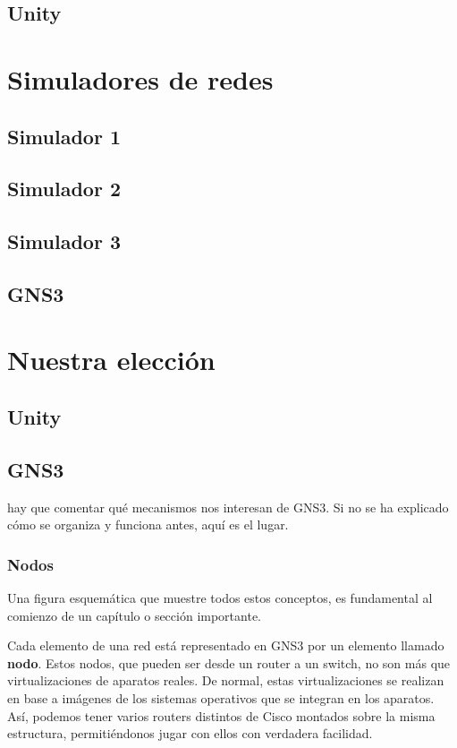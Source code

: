 \subsection{Unity}


\section{Simuladores de redes}

\subsection{Simulador 1}

\subsection{Simulador 2}

\subsection{Simulador 3}

\subsection{GNS3}

\section{Nuestra elección}

\subsection{Unity}

\subsection{GNS3}
hay que comentar qué mecanismos nos interesan de GNS3. Si no se ha explicado cómo se organiza y funciona antes, aquí es el lugar.

\subsubsection{Nodos}
Una figura esquemática que muestre todos estos conceptos, es fundamental al comienzo de un capítulo o sección importante.

Cada elemento de una red está representado en GNS3 por un elemento llamado \textbf{nodo}. Estos nodos, que pueden ser desde un router a un switch, no son más que virtualizaciones de aparatos reales. De normal, estas virtualizaciones se realizan en base a imágenes de los sistemas operativos que se integran en los aparatos. Así, podemos tener varios routers distintos de Cisco montados sobre la misma estructura, permitiéndonos jugar con ellos con verdadera facilidad.

